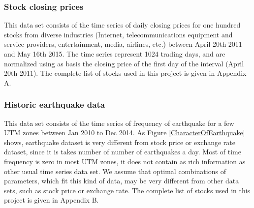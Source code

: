 \documentclass{article}
\begin{document}
\subsubsection{Stock closing prices}

This data set consists of the time series of daily closing prices for one hundred stocks from diverse industries (Internet, telecommunications equipment and service providers, entertainment, media, airlines, etc.) between April 20th 2011 and May 16th 2015. The time series represent 1024 trading days, and are normalized using as basis the closing price of the first day of the interval (April 20th 2011). The complete list of stocks used in this project is given in Appendix A.




\subsubsection{Historic earthquake data}
This data set consists of the time series of frequency of earthquake for a few UTM zones between Jan 2010 to Dec 2014. As Figure \ref{CharacterOfEarthquake} shows, earthquake dataset is very different from stock price or exchange rate dataset, since it is takes number of number of earthquakes a day. Most of time frequency is zero in most UTM zones, it does not contain as rich information as other usual time series data set. We assume that optimal combinations of parameters, which fit this kind of data, may be very different from other data sets, such as stock price or exchange rate. The complete list of stocks used in this project is given in Appendix B.
\end{document}
